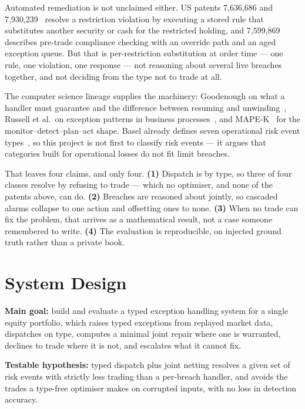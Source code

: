\documentclass[11pt]{article}
\begin{document}
Automated remediation is not unclaimed either. US patents 7,636,686 and 7,930,239~\cite{patent686}
resolve a restriction violation by executing a stored rule that substitutes another security or
cash for the restricted holding, and 7,599,869 describes pre-trade compliance checking with an
override path and an aged exception queue. But that is per-restriction substitution at order
time --- one rule, one violation, one response --- not reasoning about several live breaches
together, and not deciding from the type not to trade at all.

The computer science lineage supplies the machinery: Goodenough on what a handler must guarantee
and the difference between resuming and unwinding~\cite{goodenough1975}, Russell et al.\ on
exception patterns in business processes~\cite{russell2006}, and MAPE-K~\cite{kephart2003} for
the monitor--detect--plan--act shape. Basel already defines seven operational risk event
types~\cite{basel}, so this project is not first to classify risk events --- it argues that
categories built for operational losses do not fit limit breaches.

That leaves four claims, and only four. \textbf{(1)} Dispatch is by type, so three of four
classes resolve by refusing to trade --- which no optimiser, and none of the patents above,
can do. \textbf{(2)} Breaches are reasoned about jointly, so cascaded alarms collapse to one
action and offsetting ones to none. \textbf{(3)} When no trade can fix the problem, that
arrives as a mathematical result, not a case someone remembered to write. \textbf{(4)} The
evaluation is reproducible, on injected ground truth rather than a private book.

\section{System Design}

\textbf{Main goal:} build and evaluate a typed exception handling system for a single
equity portfolio, which raises typed exceptions from replayed market data, dispatches on
type, computes a minimal joint repair where one is warranted, declines to trade where it
is not, and escalates what it cannot fix.

\textbf{Testable hypothesis:} typed dispatch plus joint netting resolves a given set of
risk events with strictly less trading than a per-breach handler, and avoids the trades a
type-free optimiser makes on corrupted inputs, with no loss in detection accuracy.
\end{document}
